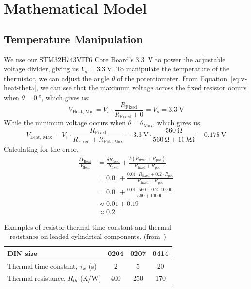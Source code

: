 \documentclass[12pt,a4paper]{article}
\begin{document}
\section{Mathematical Model}

\subsection{Temperature Manipulation}
We use our STM32H743VIT6 Core Board's \SI{3.3}{\volt} to power the adjustable voltage divider, giving us $V_s=\SI{3.3}{\volt}$. To manipulate the temperature of the thermistor, we can adjust the angle $\theta$ of the potentiometer. From Equation~\eqref{eq:v-heat-theta}, we can see that the maximum voltage across the fixed resistor occurs when $\theta = \SI{0}{\degree}$, which gives us:
\begin{equation*}
    V_{\text{Heat, Min}} = V_s \cdot \frac{R_{\text{Fixed}}}{R_{\text{Fixed}} + 0} = V_s = \SI{3.3}{\volt}
\end{equation*}
While the minimum voltage occurs when $\theta = \theta_{\text{Max}}$, which gives us:
\begin{equation*}
    V_{\text{Heat, Max}} = V_s \cdot \frac{R_{\text{Fixed}}}{R_{\text{Fixed}} + R_{\text{Pot, Max}}} = \SI{3.3}{\volt} \cdot \frac{\SI{560}{\ohm}}{\SI{560}{\ohm} + \SI{10}{k\ohm}} = \SI{0.175}{\volt}
\end{equation*}
Calculating for the error,
\begin{align*}
    \frac{\delta V_{\text{Heat}}}{V_{\text{Heat}}} &=  \frac{\delta R_\text{fixed}}{R_\text{fixed}} + \frac{\delta (R_\text{fixed} + R_\text{pot})}{R_\text{fixed} + R_\text{pot}} \\
    &= 0.01 + \frac{0.01 \cdot R_\text{fixed} + 0.2 \cdot R_\text{pot}}{R_\text{fixed} + R_\text{pot}} \\
    &= 0.01 + \frac{0.01 \cdot 560 + 0.2 \cdot 10000}{560 + 10000} \\
    &\approx 0.01 + 0.19 \\
    &\approx 0.2
\end{align*}

\begin{table}[h!]
\centering
\begin{tabular}{lccc}
\hline
\textbf{DIN size} & \textbf{0204} & \textbf{0207} & \textbf{0414} \\
\hline
Thermal time constant, $\tau_w$ (s) & 2 & 5 & 20 \\
Thermal resistance, $R_{th}$ (K/W)  & 400 & 250 & 170 \\
\hline
\end{tabular}
\caption{Examples of resistor thermal time constant and thermal resistance on leaded cylindrical components. (from~\cite{thermal-resistance})}
\label{tab:thermal-resistance}
\end{table}
\end{document}
